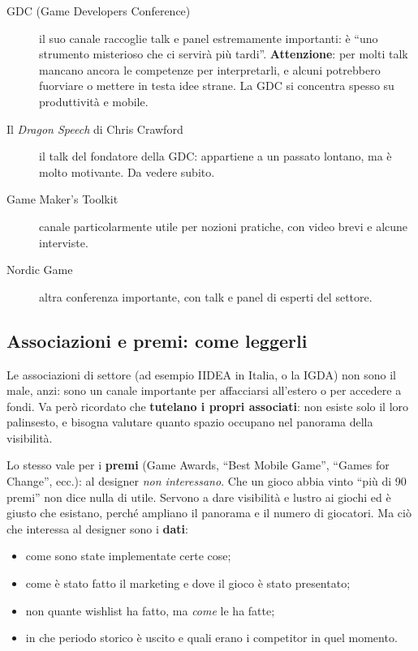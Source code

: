 

\begin{description}
  \item[GDC (Game Developers Conference)] il suo canale raccoglie talk e
        panel estremamente importanti: è ``uno strumento misterioso che ci
        servirà più tardi''. \textbf{Attenzione}: per molti talk mancano ancora
        le competenze per interpretarli, e alcuni potrebbero fuorviare o
        mettere in testa idee strane. La GDC si concentra spesso su
        produttività e mobile.
  \item[Il \emph{Dragon Speech} di Chris Crawford] il talk del fondatore della
        GDC: appartiene a un passato lontano, ma è molto motivante. Da vedere
        subito.
  \item[Game Maker's Toolkit] canale particolarmente utile per nozioni
        pratiche, con video brevi e alcune interviste.
  \item[Nordic Game] altra conferenza importante, con talk e panel di esperti
        del settore.
\end{description}

\subsection{Associazioni e premi: come leggerli}



Le associazioni di settore (ad esempio IIDEA in Italia, o la IGDA) non sono
il male, anzi: sono un canale importante per affacciarsi all'estero o per
accedere a fondi. Va però ricordato che \textbf{tutelano i propri associati}:
non esiste solo il loro palinsesto, e bisogna valutare quanto spazio occupano
nel panorama della visibilità.

Lo stesso vale per i \textbf{premi} (Game Awards, ``Best Mobile Game'',
``Games for Change'', ecc.): al designer \emph{non interessano}. Che un gioco
abbia vinto ``più di 90 premi'' non dice nulla di utile. Servono a dare
visibilità e lustro ai giochi ed è giusto che esistano, perché ampliano il
panorama e il numero di giocatori. Ma ciò che interessa al designer sono i
\textbf{dati}:
\begin{itemize}
  \item come sono state implementate certe cose;
  \item come è stato fatto il marketing e dove il gioco è stato presentato;
  \item non quante wishlist ha fatto, ma \emph{come} le ha fatte;
  \item in che periodo storico è uscito e quali erano i competitor in quel
        momento.
\end{itemize}


